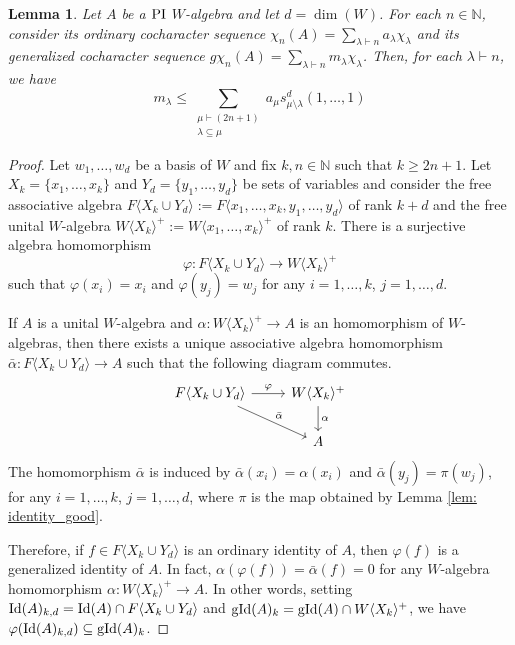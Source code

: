 \documentclass{article}
\newtheorem{lemma}[theorem]{Lemma}
\newcommand{\bN}{\mathbb{N}}
\DeclareMathOperator{\Polid}{\textnormal{PI}}
\DeclareMathOperator{\gid}{\textnormal{gId}}
\DeclareMathOperator{\id}{\textnormal{Id}}
\begin{document}
\begin{lemma}\label{lem: multiplicity bound}
Let $A$ be a $\Polid$ $W$-algebra and let $d=\dim(W)$. For each $n\in\mathbb{N}$, consider its ordinary cocharacter sequence
$ \chi_n(A) = \sum_{\lambda \vdash n} a_\lambda \chi_\lambda $
and its generalized cocharacter sequence
$ g\chi_n(A) = \sum_{\lambda \vdash n} m_\lambda \chi_\lambda $. 
Then, for each $\lambda\vdash n$, we have \begin{equation}\label{eq: multiplicity bound}
    m_\lambda \leq \sum_{\substack{ \mu\vdash (2n+1) \\ \lambda \subseteq \mu}} a_\mu s^d_{\mu\setminus\lambda} (1,\dots,1)
\end{equation}
\end{lemma}
\begin{proof} 
    Let $w_1,\dots,w_d$ be a basis of $W$ and fix $k,n\in\bN$ such that $k\geq 2n+1$. Let $X_k=\{x_1,\dots,x_k\}$ and $Y_d=\{y_1,\dots,y_d\}$ be sets of variables and consider the free associative algebra $F\langle X_k\cup Y_d\rangle := F\langle x_1,\dots,x_k,y_1,\dots,y_d\rangle$ of rank $k+d$ and the free unital $W$-algebra $W\langle X_k\rangle^+:=W\langle x_1,\dots,x_k\rangle^+$ of rank $k$. There is a surjective algebra homomorphism 
    \begin{equation*}
    	\varphi:F\langle X_k\cup Y_d\rangle \rightarrow W\langle X_k\rangle^+
    \end{equation*}
    such that $\varphi(x_i) = x_i$ and $\varphi(y_j) = w_j$ for any $i=1,\dots,k$, $j=1,\dots,d$.

    If $A$ is a unital $W$-algebra and $\alpha: W\langle X_k\rangle^+\rightarrow A$ is an homomorphism of $W$-algebras, then there exists a unique associative algebra homomorphism $\bar \alpha: F\langle X_k\cup Y_d\rangle \rightarrow A$ such that the following diagram commutes.
    \[ \begin{tikzcd}
    	F\langle X_k\cup Y_d\rangle \arrow[r, "\varphi"] \arrow[dr, "\bar\alpha" ] & W\langle X_k\rangle^+ \arrow[d, "\alpha"] \\
    	{}  & A
    \end{tikzcd}\]
    The homomorphism $\bar\alpha$ is induced by $\bar\alpha(x_i) =\alpha(x_i)$ and $\bar\alpha(y_j) = \pi(w_j)$, for any $i=1,\dots,k$, $j=1,\dots,d$, where $\pi$ is the map obtained by Lemma \ref{lem: identity_good}.
    
    Therefore, if $f\in F\langle X_k\cup Y_d\rangle$ is an ordinary identity of $A$, then $\varphi(f)$ is a generalized identity of $A$. In fact, $\alpha(\varphi(f))=\bar\alpha(f)=0$ for any $W$-algebra homomorphism $\alpha: W\langle X_k\rangle^+\rightarrow A$. In other words, setting $\id(A)_{k,d}=\id(A)\cap F\langle X_k\cup Y_d\rangle$ and $\gid(A)_k=\gid(A)\cap W\langle X_k\rangle^+$, we have $\varphi(\id(A)_{k,d})\subseteq \gid(A)_k$.


\end{proof}
\end{document}
